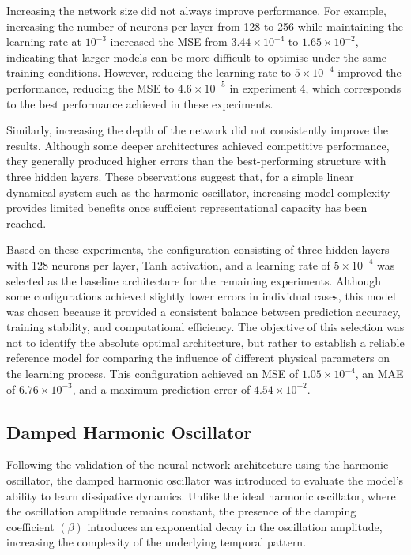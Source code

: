 Increasing the network size did not always improve performance. For example, increasing the number of neurons per layer from 128 to 256 while maintaining the learning rate at $10^{-3}$ increased the MSE from $3.44\times10^{-4}$ to $1.65\times10^{-2}$, indicating that larger models can be more difficult to optimise under the same training conditions. However, reducing the learning rate to $5\times10^{-4}$ improved the performance, reducing the MSE to $4.6\times10^{-5}$ in experiment 4, which corresponds to the best performance achieved in these experiments.

Similarly, increasing the depth of the network did not consistently improve the results. Although some deeper architectures achieved competitive performance, they generally produced higher errors than the best-performing structure with three hidden layers. These observations suggest that, for a simple linear dynamical system such as the harmonic oscillator, increasing model complexity provides limited benefits once sufficient representational capacity has been reached.

Based on these experiments, the configuration consisting of three hidden layers with 128 neurons per layer, Tanh activation, and a learning rate of $5\times10^{-4}$ was selected as the baseline architecture for the remaining experiments. Although some configurations achieved slightly lower errors in individual cases, this model was chosen because it provided a consistent balance between prediction accuracy, training stability, and computational efficiency. The objective of this selection was not to identify the absolute optimal architecture, but rather to establish a reliable reference model for comparing the influence of different physical parameters on the learning process. This configuration achieved an MSE of $1.05\times10^{-4}$, an MAE of $6.76\times10^{-3}$, and a maximum prediction error of $4.54\times10^{-2}$.

\subsection{Damped Harmonic Oscillator}
Following the validation of the neural network architecture using the harmonic oscillator, the damped harmonic oscillator was introduced to evaluate the model’s ability to learn dissipative dynamics. Unlike the ideal harmonic oscillator, where the oscillation amplitude remains constant, the presence of the damping coefficient $(\beta)$ introduces an exponential decay in the oscillation amplitude, increasing the complexity of the underlying temporal pattern.

